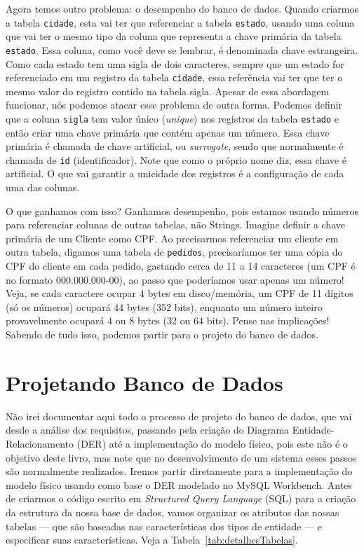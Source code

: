Agora temos outro problema: o desempenho do banco de dados. Quando criarmos a tabela \texttt{cidade}, esta vai ter que referenciar a tabela \texttt{estado}, usando uma coluna que vai ter o mesmo tipo da coluna que representa a chave primária da tabela \texttt{estado}. Essa coluna, como você deve se lembrar, é denominada chave estrangeira. Como cada estado tem uma sigla de dois caracteres, sempre que um estado for referenciado em um registro da tabela \texttt{cidade}, essa referência vai ter que ter o mesmo valor do registro contido na tabela sigla. Apesar de essa abordagem funcionar, nós podemos atacar esse problema de outra forma. Podemos definir que a coluna \texttt{sigla} tem valor único (\textit{unique}) nos registros da tabela \texttt{estado} e então criar uma chave primária que contém apenas um número. Essa chave primária é chamada de chave artificial, ou \textit{surrogate}, sendo que normalmente é chamada de \texttt{id} (identificador). Note que como o próprio nome diz, essa chave é artificial. O que vai garantir a unicidade dos registros é a configuração de cada uma das colunas.

O que ganhamos com isso? Ganhamos desempenho, pois estamos usando números para referenciar colunas de outras tabelas, não Strings. Imagine definir a chave primária de um Cliente como CPF. Ao precisarmos referenciar um cliente em outra tabela, digamos uma tabela de \texttt{pedidos}, precisaríamos ter uma cópia do CPF do cliente em cada pedido, gastando cerca de 11 a 14 caracteres (um CPF é no formato 000.000.000-00), ao passo que poderíamos usar apenas um número! Veja, se cada caractere ocupar 4 bytes em disco/memória, um CPF de 11 dígitos (só os números) ocupará 44 bytes (352 bits), enquanto um número inteiro provavelmente ocupará 4 ou 8 bytes (32 ou 64 bits). Pense nas implicações! Sabendo de tudo isso, podemos partir para o projeto do banco de dados.


\section{Projetando Banco de Dados}

Não irei documentar aqui todo o processo de projeto do banco de dados, que vai desde a análise dos requisitos, passando pela criação do Diagrama Entidade-Relacionamento (DER) até a implementação do modelo físico, pois este não é o objetivo deste livro, mas note que no desenvolvimento de um sistema esses passos são normalmente realizados. Iremos partir diretamente para a implementação do modelo físico usando como base o DER modelado no MySQL Workbench. Antes de criarmos o código escrito em \textit{Structured Query Language} (SQL) para a criação da estrutura da nossa base de dados, vamos organizar os atributos das nossas tabelas --- que são baseadas nas características dos tipos de entidade --- e especificar suas características. Veja a Tabela~\ref{tab:detalhesTabelas}.

